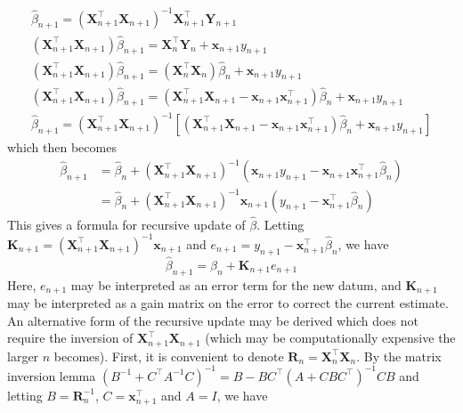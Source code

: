 \documentclass[11pt]{report} %
\begin{document}
\begin{gather}
\hat{\beta}_{n + 1} = \left(\mathbf{X}_{n + 1}^{\top}\mathbf{X}_{n + 1}\right)^{-1}\mathbf{X}_{n + 1}^{\top}\mathbf{Y}_{n + 1} \\
\left(\mathbf{X}_{n + 1}^{\top}\mathbf{X}_{n + 1}\right)\hat{\beta}_{n + 1} = \mathbf{X}_{n}^{\top}\mathbf{Y}_{n} + \mathbf{x}_{n + 1}y_{n + 1} \\
\left(\mathbf{X}_{n + 1}^{\top}\mathbf{X}_{n + 1}\right)\hat{\beta}_{n + 1} = \left(\mathbf{X}_{n}^{\top}\mathbf{X}_{n}\right)\hat{\beta}_{n} + \mathbf{x}_{n + 1}y_{n + 1} \\
\left(\mathbf{X}_{n + 1}^{\top}\mathbf{X}_{n + 1}\right)\hat{\beta}_{n + 1} = \left(\mathbf{X}_{n+1}^{\top}\mathbf{X}_{n+1} - \mathbf{x}_{n + 1}\mathbf{x}_{n + 1}^{\top}\right)\hat{\beta}_{n} + \mathbf{x}_{n + 1}y_{n + 1} \\
\hat{\beta}_{n + 1} = \left(\mathbf{X}_{n + 1}^{\top}\mathbf{X}_{n + 1}\right)^{-1}\left[\left(\mathbf{X}_{n+1}^{\top}\mathbf{X}_{n+1} - \mathbf{x}_{n + 1}\mathbf{x}_{n + 1}^{\top}\right)\hat{\beta}_{n} + \mathbf{x}_{n + 1}y_{n + 1}\right]
\end{gather}
which then becomes
\begin{align}
\hat{\beta}_{n + 1} &= \hat{\beta}_{n} + \left(\mathbf{X}_{n + 1}^{\top}\mathbf{X}_{n + 1}\right)^{-1}\left(\mathbf{x}_{n + 1}y_{n + 1} - \mathbf{x}_{n + 1}\mathbf{x}_{n + 1}^{\top}\hat{\beta}_{n}\right) \\
&= \hat{\beta}_{n} + \left(\mathbf{X}_{n + 1}^{\top}\mathbf{X}_{n + 1}\right)^{-1}\mathbf{x}_{n + 1}\left(y_{n + 1} - \mathbf{x}_{n + 1}^{\top}\hat{\beta}_{n}\right)
\end{align}
This gives a formula for recursive update of $\hat{\beta}$. Letting $\mathbf{K}_{n + 1} = \left(\mathbf{X}_{n + 1}^{\top}\mathbf{X}_{n + 1}\right)^{-1}\mathbf{x}_{n + 1}$ and $e_{n + 1} = y_{n + 1} - \mathbf{x}_{n + 1}^{\top}\hat{\beta}_{n}$, we have
\begin{equation}
\hat{\beta}_{n + 1} = \hat{\beta}_{n} + \mathbf{K}_{n + 1}e_{n + 1}
\end{equation}
Here, $e_{n + 1}$ may be interpreted as an error term for the new datum, and $ \mathbf{K}_{n + 1}$ may be interpreted as a gain matrix on the error to correct the current estimate. An alternative form of the recursive update may be derived which does not require the inversion of $\mathbf{X}_{n + 1}^{\top}\mathbf{X}_{n + 1}$ (which may be computationally expensive the larger $n$ becomes). First, it is convenient to denote $\mathbf{R}_{n} = \mathbf{X}_{n}^{\top}\mathbf{X}_{n}$. By the matrix inversion lemma $\left(B^{-1} + C^{\top}A^{-1}C\right)^{-1} = B - BC^{\top}\left(A+CBC^{\top}\right)^{-1}CB$ and letting $B = \mathbf{R}_{n}^{-1}$, $C = \mathbf{x}_{n + 1}^{\top}$ and $A = I$, we have
\end{document}
